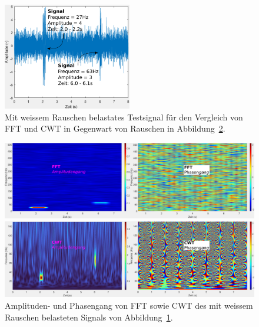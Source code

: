 \begin{figure}
	\centering
	\includegraphics[width=0.5\textwidth]{papers/wavelets/images/18-4_CWTvsFFTSignalNoisy.png}
	\caption{Mit weissem Rauschen belastates Testsignal für den
	Vergleich von FFT und CWT in Gegenwart von Rauschen in
	Abbildung~\ref{wavelet:fig:FFTnoisy}.
	\label{wavelet:fig:FFTnoisy:beispiel}}
\end{figure}
\begin{figure}
	\centering
	\includegraphics[width=\textwidth]{papers/wavelets/images/18-5_FFTnoisy.png}

	\vspace*{0.4cm}
	\includegraphics[width=\textwidth]{papers/wavelets/images/18-6_CWTnoisy.png}
	\caption{Amplituden- und Phasengang von FFT sowie CWT des
	mit weissem Rauschen belasteten Signals von
	Abbildung~\ref{wavelet:fig:FFTnoisy:beispiel}.}
	\label{wavelet:fig:FFTnoisy}
\end{figure}
